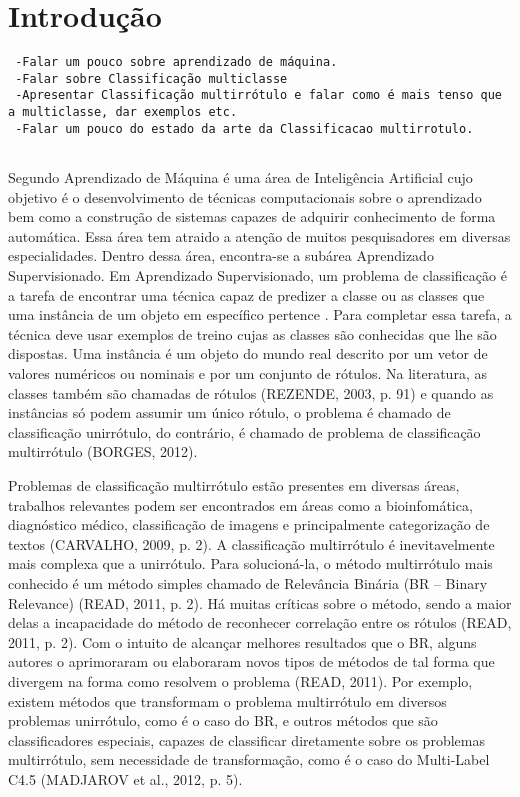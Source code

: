 \newcommand{\NbasesV}{\textit{N}}
\newcommand{\Nbases}{6}
\newcommand{\Nml}{6}
\newcommand{\NmlT}{5}
\newcommand{\NmlA}{2}
\newcommand{\Ncb}{4}
\newcommand{\MML}{método multirrótulo}
\newcommand{\MMLs}{métodos multirrótulo}
\newcommand{\MRLM}{Recursive Dependent Binary Relevance}
\newcommand{\MRLMa}{RDBR}

\chapter{Introdução}
\begin{verbatim}
 -Falar um pouco sobre aprendizado de máquina.
 -Falar sobre Classificação multiclasse
 -Apresentar Classificação multirrótulo e falar como é mais tenso que a multiclasse, dar exemplos etc.
 -Falar um pouco do estado da arte da Classificacao multirrotulo.
 
\end{verbatim}

Segundo \cite{rezende2003sistemas} Aprendizado de Máquina é uma área de Inteligência Artificial
cujo objetivo é o desenvolvimento de técnicas computacionais
sobre o aprendizado bem como a construção de sistemas capazes de adquirir
conhecimento de forma automática. Essa área tem atraido a atenção de muitos 
pesquisadores em diversas especialidades. Dentro dessa área, encontra-se a subárea Aprendizado Supervisionado.
Em Aprendizado Supervisionado, um problema de classificação é a tarefa de encontrar
uma técnica capaz de predizer a classe ou as classes que uma instância de
um objeto em específico pertence \cite{rezende2003sistemas}.
Para completar essa tarefa, a técnica deve usar exemplos de treino cujas as classes
são conhecidas que lhe são dispostas. Uma instância é um objeto do mundo real descrito
por um vetor de valores numéricos ou nominais e por um conjunto de rótulos.
Na literatura, as classes também são chamadas de rótulos (REZENDE, 2003, p. 91)
e quando as instâncias só podem assumir um único rótulo, o problema é chamado de classificação unirrótulo,
do contrário, é chamado de problema de classificação multirrótulo (BORGES, 2012).

Problemas de classificação multirrótulo estão presentes em diversas áreas, trabalhos relevantes podem
ser encontrados em áreas como a bioinfomática, diagnóstico médico, classificação de imagens e principalmente
categorização de textos (CARVALHO, 2009, p. 2). A classificação multirrótulo é inevitavelmente
mais complexa que a unirrótulo. Para solucioná-la,  o método multirrótulo mais conhecido é um método simples chamado de
Relevância Binária (BR – Binary Relevance) (READ, 2011, p. 2). 
Há muitas críticas sobre o método, sendo a maior delas a incapacidade do método de reconhecer correlação entre os rótulos (READ, 2011, p. 2).
Com o intuito de alcançar melhores resultados que o BR, alguns autores o aprimoraram ou elaboraram novos tipos de métodos
de tal forma que divergem na forma como resolvem o problema (READ, 2011). 
Por exemplo, existem métodos que transformam o problema multirrótulo em
diversos problemas unirrótulo, como é o caso do BR, e outros métodos que são classificadores especiais, capazes de classificar diretamente sobre os problemas multirrótulo, sem necessidade de transformação, como é o caso do Multi-Label C4.5 (MADJAROV et al., 2012, p. 5). 


